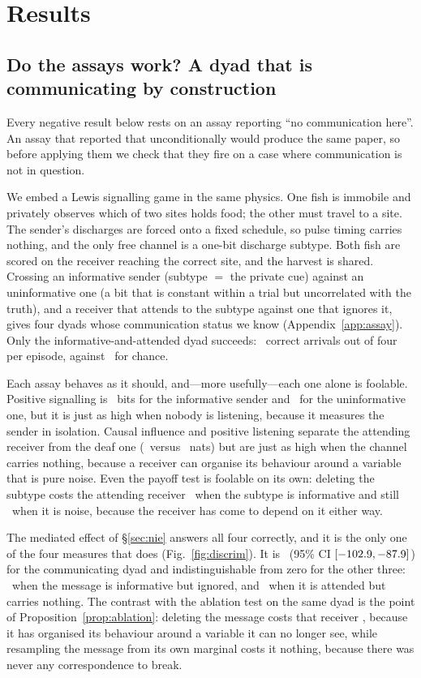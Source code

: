 \section{Results}

\subsection{Do the assays work? A dyad that is communicating by construction}
\label{sec:assay}

Every negative result below rests on an assay reporting ``no communication
here''. An assay that reported that unconditionally would produce the same
paper, so before applying them we check that they fire on a case where
communication is not in question.

We embed a Lewis signalling game in the same physics. One fish is immobile and
privately observes which of two sites holds food; the other must travel to a
site. The sender's discharges are forced onto a fixed schedule, so pulse timing
carries nothing, and the only free channel is a one-bit discharge subtype. Both
fish are scored on the receiver reaching the correct site, and the harvest is
shared. Crossing an informative sender (subtype $=$ the private cue) against an
uninformative one (a bit that is constant within a trial but uncorrelated with
the truth), and a receiver that attends to the subtype against one that ignores
it, gives four dyads whose communication status we know
(Appendix~\ref{app:assay}). Only the informative-and-attended dyad succeeds:
\AssayArrHonest\ correct arrivals out of four per episode, against \AssayArrDeaf\
for chance.

Each assay behaves as it should, and---more usefully---each one alone is
foolable. Positive signalling is \AssayMIHonest\ bits for the informative sender
and \AssayMIRandom\ for the uninformative one, but it is just as high when
nobody is listening, because it measures the sender in isolation. Causal
influence and positive listening separate the attending receiver from the deaf
one (\AssayCIEListen\ versus \AssayCIEDeaf\ nats) but are just as high when the
channel carries nothing, because a receiver can organise its behaviour around a
variable that is pure noise. Even the payoff test is foolable on its own:
deleting the subtype costs the attending receiver \AssayKillHonest\ when the
subtype is informative and still \AssayKillRandom\ when it is noise, because the
receiver has come to depend on it either way.

The mediated effect of \S\ref{sec:nie} answers all four correctly, and it is the
only one of the four measures that does (Fig.~\ref{fig:discrim}). It is
\NIEHonest\ (95\% CI $[-102.9, -87.9]$) for the communicating dyad
and indistinguishable from zero for the other three: \NIEDeaf\ when the message
is informative but ignored, and \NIENoise\ when it is attended but carries
nothing. The contrast with the ablation test on the same dyad is the point of
Proposition~\ref{prop:ablation}: deleting the message costs that receiver
\KillNoise, because it has organised its behaviour around a variable it can no
longer see, while resampling the message from its own marginal costs it nothing,
because there was never any correspondence to break.

